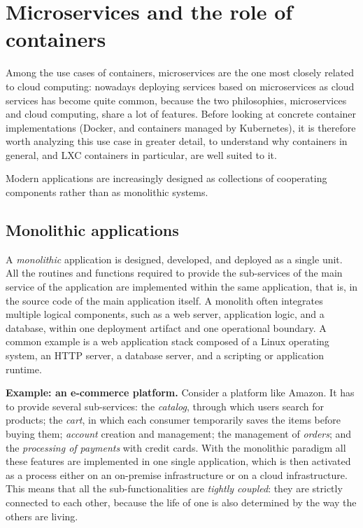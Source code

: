 \section{Microservices and the role of containers}

Among the use cases of containers, microservices are the one most closely related to cloud computing: nowadays deploying services based on microservices as cloud services has become quite common, because the two philosophies, microservices and cloud computing, share a lot of features. Before looking at concrete container implementations (Docker, and containers managed by Kubernetes), it is therefore worth analyzing this use case in greater detail, to understand why containers in general, and LXC containers in particular, are well suited to it.

Modern applications are increasingly designed as collections of cooperating components rather than as monolithic systems.

\subsection{Monolithic applications}

A \emph{monolithic} application is designed, developed, and deployed as a single unit. All the routines and functions required to provide the sub-services of the main service of the application are implemented within the same application, that is, in the source code of the main application itself. A monolith often integrates multiple logical components, such as a web server, application logic, and a database, within one deployment artifact and one operational boundary. A common example is a web application stack composed of a Linux operating system, an HTTP server, a database server, and a scripting or application runtime.

\begin{notebox}
	\textbf{Example: an e-commerce platform.} Consider a platform like Amazon. It has to provide several sub-services: the \emph{catalog}, through which users search for products; the \emph{cart}, in which each consumer temporarily saves the items before buying them; \emph{account} creation and management; the management of \emph{orders}; and the \emph{processing of payments} with credit cards. With the monolithic paradigm all these features are implemented in one single application, which is then activated as a process either on an on-premise infrastructure or on a cloud infrastructure. This means that all the sub-functionalities are \emph{tightly coupled}: they are strictly connected to each other, because the life of one is also determined by the way the others are living.
\end{notebox}

